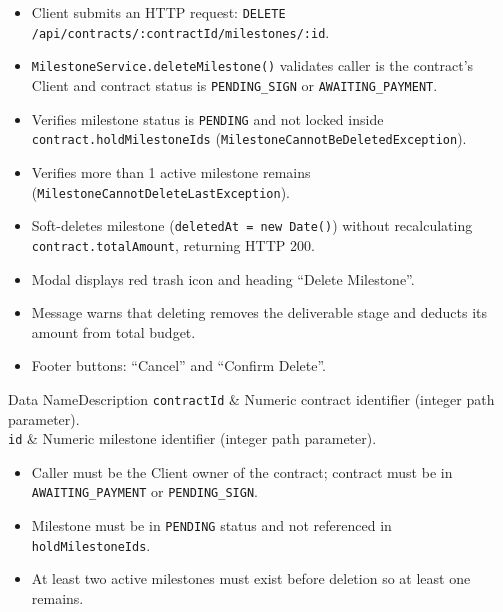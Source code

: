 \begin{itemize}[leftmargin=1.6em,topsep=3pt,itemsep=2pt,parsep=0pt,label=$\bullet$]
      \item Client submits an HTTP request: \texttt{DELETE /\allowbreak{}api/\allowbreak{}contracts/\allowbreak{}:\allowbreak{}contractId/\allowbreak{}milestones/\allowbreak{}:\allowbreak{}id}.
      \item \texttt{MilestoneService.deleteMilestone()} validates caller is the contract's Client and contract status is \texttt{PENDING\_SIGN} or \texttt{AWAITING\_PAYMENT}.
      \item Verifies milestone status is \texttt{PENDING} and not locked inside \texttt{contract.holdMilestoneIds} (\texttt{MilestoneCannotBeDeletedException}).
      \item Verifies more than 1 active milestone remains (\texttt{MilestoneCannotDeleteLastException}).
      \item Soft-deletes milestone (\texttt{deletedAt = new Date()}) without recalculating \texttt{contract.totalAmount}, returning HTTP 200.
\end{itemize}

\begin{itemize}[leftmargin=1.6em,topsep=3pt,itemsep=2pt,parsep=0pt,label=$\bullet$]
      \item Modal displays red trash icon and heading ``Delete Milestone''.
      \item Message warns that deleting removes the deliverable stage and deducts its amount from total budget.
      \item Footer buttons: ``Cancel'' and ``Confirm Delete''.
\end{itemize}


\begin{specdatatable}{Data Name}{Description}
      \texttt{contractId} & Numeric contract identifier (integer path parameter).\\ \hline
      \texttt{id} & Numeric milestone identifier (integer path parameter).\\ \hline
\end{specdatatable}

\begin{itemize}[leftmargin=1.6em,topsep=3pt,itemsep=2pt,parsep=0pt,label=$\bullet$]
      \item Caller must be the Client owner of the contract; contract must be in \texttt{AWAITING\_PAYMENT} or \texttt{PENDING\_SIGN}.
      \item Milestone must be in \texttt{PENDING} status and not referenced in \texttt{holdMilestoneIds}.
      \item At least two active milestones must exist before deletion so at least one remains.
\end{itemize}

